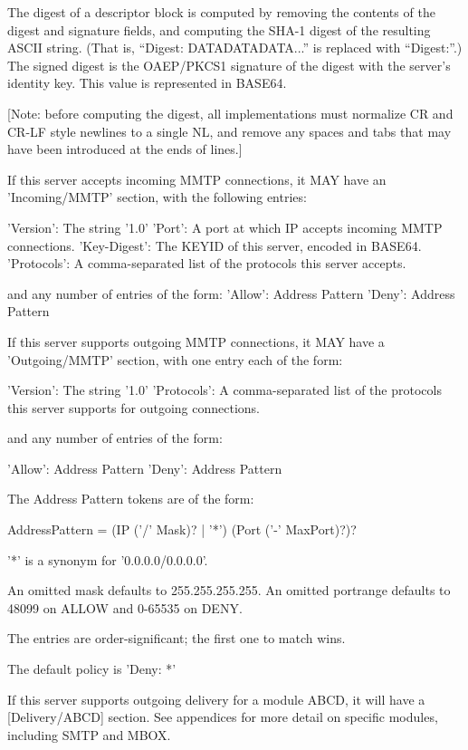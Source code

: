 The digest of a descriptor block is computed by removing the contents of the
digest and signature fields, and computing the SHA-1 digest of the resulting
ASCII string.  (That is, ``Digest: DATADATADATA...'' is replaced with
``Digest:''.)  The signed digest is the OAEP/PKCS1 signature of the digest
with the server's identity key.  This value is represented in BASE64.

[Note: before computing the digest, all implementations must normalize CR and
CR-LF style newlines to a single NL, and remove any spaces and tabs that may
have been introduced at the ends of lines.]

If this server accepts incoming MMTP connections, it MAY have an
'Incoming/MMTP' section, with the following entries:

     'Version': The string '1.0'
     'Port': A port at which IP accepts incoming MMTP connections.
     'Key-Digest': The KEYID of this server, encoded in BASE64.
     'Protocols': A comma-separated list of the protocols this
           server accepts.

and any number of entries of the form:
     'Allow': Address Pattern
     'Deny': Address Pattern

If this server supports outgoing MMTP connections, it MAY have a
'Outgoing/MMTP' section, with one entry each of the form:

      'Version': The string '1.0'
      'Protocols': A comma-separated list of the protocols this server
           supports for outgoing connections.

and any number of entries of the form:

      'Allow': Address Pattern
      'Deny': Address Pattern

The Address Pattern tokens are of the form:

   AddressPattern = (IP ('/' Mask)? | '*') (Port ('-' MaxPort)?)?

'*' is a synonym for '0.0.0.0/0.0.0.0'.

An omitted mask defaults to 255.255.255.255.  An omitted portrange
defaults to 48099 on ALLOW and 0-65535 on DENY.

The entries are order-significant; the first one to match wins.

The default policy is 'Deny: *'

If this server supports outgoing delivery for a module ABCD, it will
have a [Delivery/ABCD] section.  See appendices for more detail on
specific modules, including SMTP and MBOX.

